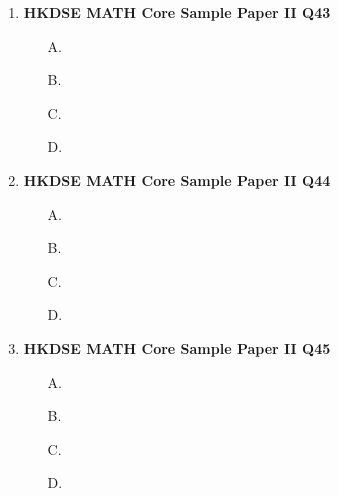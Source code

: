 \documentclass[12pt]{article}
\begin{document}
\begin{enumerate}
\begin{enumerate}
		\item[B.]
		\item[C.]
		\item[D.]
	\end{enumerate}
	\item \textbf{HKDSE MATH Core Sample Paper II Q43}\\
	\begin{enumerate}
		\item[A.]
		\item[B.]
		\item[C.]
		\item[D.]
	\end{enumerate}
	\item \textbf{HKDSE MATH Core Sample Paper II Q44}\\
	\begin{enumerate}
		\item[A.]
		\item[B.]
		\item[C.]
		\item[D.]
	\end{enumerate}
	\item \textbf{HKDSE MATH Core Sample Paper II Q45}\\
	\begin{enumerate}
		\item[A.]
		\item[B.]
		\item[C.]
		\item[D.]
	\end{enumerate}

\end{enumerate}
\end{document}
